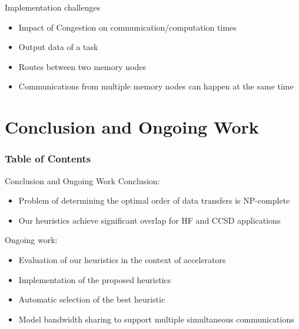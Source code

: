 \documentclass[mathserif,hyperref={pdfpagemode=FullScreen}]{beamer}
\begin{document}
\begin{frame}{Implementation challenges}
\begin{itemize}
	\vfill
	\item Impact of Congestion on communication/computation times
	\vfill
	\item Output data of a task
	\vfill
	\item Routes between two memory nodes
	\vfill
	\item Communications from multiple memory nodes can happen at the same time
	\vfill
\end{itemize}
\end{frame}


 \section{Conclusion and Ongoing Work}
 \begin{frame}
\frametitle{Table of Contents}
\tableofcontents[currentsection]
\end{frame}
 \begin{frame}{Conclusion and Ongoing Work}
Conclusion:
 \begin{itemize}
  \item Problem of determining the optimal order of data transfers is NP-complete
  \item Our heuristics achieve significant overlap for HF and CCSD applications
 \end{itemize}
\vfill
Ongoing work: 
 \begin{itemize}
  \item Evaluation of our heuristics in the context of accelerators
  \item Implementation of the proposed heuristics
 \item Automatic selection of the best heuristic
 \item Model bandwidth sharing to support multiple simultaneous communications
 \end{itemize}
 \end{frame}


\end{document}
